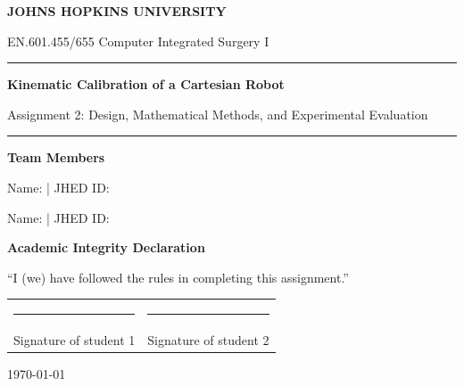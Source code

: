 \documentclass[11pt,letterpaper]{article}
\newcommand{\coursename}{EN.601.455/655 Computer Integrated Surgery I}
\newcommand{\reporttitle}{Kinematic Calibration of a Cartesian Robot}
\newcommand{\reportsubtitle}{Assignment 2: Design, Mathematical Methods, and Experimental Evaluation}
\newcommand{\teammemberone}{Name: \underline{\hspace{1.5in}} \quad | \quad JHED ID: \underline{\hspace{1.25in}}}
\newcommand{\teammembertwo}{Name: \underline{\hspace{1.5in}} \quad | \quad JHED ID: \underline{\hspace{1.25in}}}
\begin{document}
\hypersetup{pageanchor=false}
\begin{titlepage}
  \thispagestyle{empty}
  \vspace*{1.1in}
  {\large\bfseries\color{accent} JOHNS HOPKINS UNIVERSITY\par}
  \vspace{0.13in}
  {\normalsize\color{slate}\coursename\par}
  \vspace{0.5in}
  {\color{darkblue}\rule{\textwidth}{1.2pt}\par}
  \vspace{0.22in}
  {\Huge\bfseries\color{darkblue}\reporttitle\par}
  \vspace{0.18in}
  {\Large\color{slate}\reportsubtitle\par}
  \vspace{0.25in}
  {\color{darkblue}\rule{\textwidth}{0.6pt}\par}
  \vspace{0.6in}
  {\large\bfseries Team Members\par}
  \vspace{0.13in}
  \teammemberone\par
  \teammembertwo\par
  \vspace{0.38in}
  {\large\bfseries Academic Integrity Declaration\par}
  \vspace{0.1in}
  ``I (we) have followed the rules in completing this assignment.''\par
  \vspace{0.19in}
  \begin{tabularx}{\linewidth}{@{}X X@{}}
    \rule{0.92\linewidth}{0.35pt} & \rule{0.92\linewidth}{0.35pt}\\
    \small Signature of student 1 & \small Signature of student 2
  \end{tabularx}
  \vfill
  {\color{slate}\today\par}
\end{titlepage}

\setcounter{page}{1}
\end{document}
